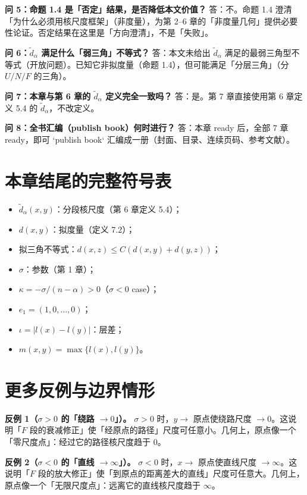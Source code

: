 \documentclass[a4paper,11pt,openany]{ctexbook}
\numberwithin{equation}{chapter}
\numberwithin{figure}{chapter}
\numberwithin{table}{chapter}
\begin{document}
\textbf{问 5：命题 1.4 是「否定」结果，是否降低本文价值？} 答：不。命题 1.4 澄清「为什么必须用核尺度框架」（非度量），为第 2–6 章的「非度量几何」提供必要性论证。否定结果在这里是「方向澄清」，不是「失败」。

\textbf{问 6：$\widetilde d_\alpha$ 满足什么「弱三角」不等式？} 答：本文未给出 $\widetilde d_\alpha$ 满足的最弱三角型不等式（开放问题）。已知它非拟度量（命题 1.4），但可能满足「分层三角」（分 $U/N/F$ 的三角）。

\textbf{问 7：本章与第 6 章的 $\widetilde d_\alpha$ 定义完全一致吗？} 答：是。第 7 章直接使用第 6 章定义 5.4 的 $\widetilde d_\alpha$，不改定义。

\textbf{问 8：全书汇编（publish book）何时进行？} 答：本章 ready 后，全部 7 章 ready，即可 `publish book` 汇编成一册（封面、目录、连续页码、参考文献）。

\section{本章结尾的完整符号表}

\begin{itemize}
\item $\widetilde d_\alpha(x,y)$：分段核尺度（第 6 章定义 5.4）；
\item $d(x,y)$：拟度量（定义 7.2）；
\item 拟三角不等式：$d(x,z)\le C(d(x,y)+d(y,z))$；
\item $\sigma$：参数（第 1 章）；
\item $\kappa=-\sigma/(n-\alpha)>0$（$\sigma<0$ case）；
\item $e_1=(1,0,\dots,0)$；
\item $\iota=|l(x)-l(y)|$：层差；
\item $m(x,y)=\max\{l(x),l(y)\}$。
\end{itemize}

\section{更多反例与边界情形}

\textbf{反例 1（$\sigma>0$ 的「绕路 $\to0$」）。} $\sigma>0$ 时，$y\to$ 原点使绕路尺度 $\to0$。这说明「$F$ 段的衰减修正」使「经原点的路径」尺度可任意小。几何上，原点像一个「零尺度点」：经过它的路径核尺度趋于 $0$。

\textbf{反例 2（$\sigma<0$ 的「直线 $\to\infty$」）。} $\sigma<0$ 时，$x\to$ 原点使直线尺度 $\to\infty$。这说明「$F$ 段的放大修正」使「到原点的距离差大的直线」尺度可任意大。几何上，原点像一个「无限尺度点」：远离它的直线核尺度趋于 $\infty$。
\end{document}
